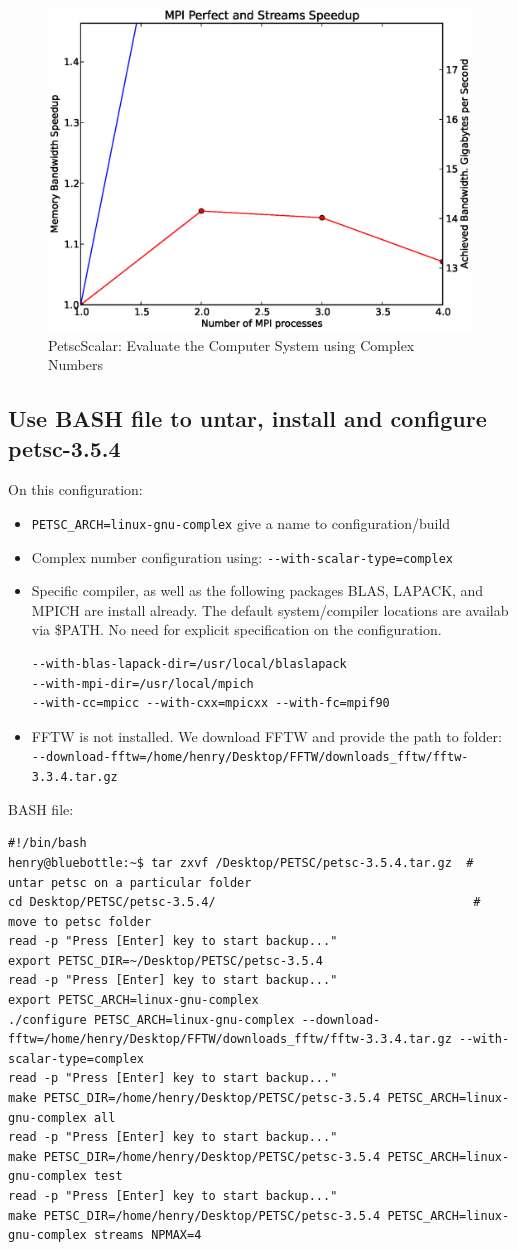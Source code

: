 \documentclass{article}
\begin{document}
\normalsize
\begin{figure}[htp]
    \centering
    \includegraphics[width=.8\textwidth, height=.4\textwidth]{petsc_3_5_4_with_fftw_and_complex_number_configuration.eps}
    \caption*{PetscScalar: Evaluate the Computer System using Complex Numbers}
    \label{checkerboard_lattice}
\end{figure}

\subsection{Use BASH file to untar, install and configure petsc-3.5.4}
On this configuration:
\begin{itemize}
\item \verb+PETSC_ARCH=linux-gnu-complex+ give a name to configuration/build
\item Complex number configuration using: \verb+--with-scalar-type=complex+
\item Specific compiler, as well as the following packages BLAS, LAPACK, and MPICH are install already. The default system/compiler locations are availab via \$PATH. No need for explicit specification on the configuration.
\begin{verbatim}
--with-blas-lapack-dir=/usr/local/blaslapack
--with-mpi-dir=/usr/local/mpich
--with-cc=mpicc --with-cxx=mpicxx --with-fc=mpif90
\end{verbatim}
\item FFTW is not installed. We download FFTW and provide the path to folder: \verb+--download-fftw=/home/henry/Desktop/FFTW/downloads_fftw/fftw-3.3.4.tar.gz+ 
\end{itemize}
BASH file:
\scriptsize
\begin{verbatim}
#!/bin/bash
henry@bluebottle:~$ tar zxvf /Desktop/PETSC/petsc-3.5.4.tar.gz  # untar petsc on a particular folder
cd Desktop/PETSC/petsc-3.5.4/                                    # move to petsc folder
read -p "Press [Enter] key to start backup..."
export PETSC_DIR=~/Desktop/PETSC/petsc-3.5.4
read -p "Press [Enter] key to start backup..."
export PETSC_ARCH=linux-gnu-complex
./configure PETSC_ARCH=linux-gnu-complex --download-fftw=/home/henry/Desktop/FFTW/downloads_fftw/fftw-3.3.4.tar.gz --with-scalar-type=complex
read -p "Press [Enter] key to start backup..."
make PETSC_DIR=/home/henry/Desktop/PETSC/petsc-3.5.4 PETSC_ARCH=linux-gnu-complex all
read -p "Press [Enter] key to start backup..."
make PETSC_DIR=/home/henry/Desktop/PETSC/petsc-3.5.4 PETSC_ARCH=linux-gnu-complex test
read -p "Press [Enter] key to start backup..."
make PETSC_DIR=/home/henry/Desktop/PETSC/petsc-3.5.4 PETSC_ARCH=linux-gnu-complex streams NPMAX=4
\end{verbatim}
\normalsize
\end{document}
